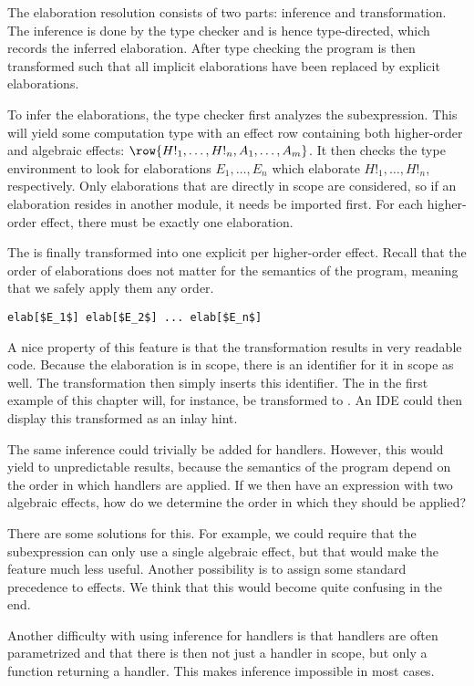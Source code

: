 The elaboration resolution consists of two parts: inference and transformation. The inference is done by the type checker and is hence type-directed, which records the inferred elaboration. After type checking the program is then transformed such that all implicit elaborations have been replaced by explicit elaborations.

To infer the elaborations, the type checker first analyzes the subexpression. This will yield some computation type with an effect row containing both higher-order and algebraic effects: $\row{H!_1, \dots, H!_n, A_1, \dots, A_m}$. It then checks the type environment to look for elaborations $E_1, \dots, E_n$ which elaborate $H!_1, \dots, H!_n$, respectively. Only elaborations that are directly in scope are considered, so if an elaboration resides in another module, it needs be imported first. For each higher-order effect, there must be exactly one elaboration.

The  is finally transformed into one explicit  per higher-order effect. Recall that the order of elaborations does not matter for the semantics of the program, meaning that we safely apply them any order.

\begin{lstlisting}[language=elaine,style=fancy]
elab[$E_1$] elab[$E_2$] ... elab[$E_n$]
\end{lstlisting}

A nice property of this feature is that the transformation results in very readable code. Because the elaboration is in scope, there is an identifier for it in scope as well. The transformation then simply inserts this identifier. The \elab in the first example of this chapter will, for instance, be transformed to . An IDE could then display this transformed  as an inlay hint.


The same inference could trivially be added for handlers. However, this would yield to unpredictable results, because the semantics of the program depend on the order in which handlers are applied. If we then have an expression with two algebraic effects, how do we determine the order in which they should be applied?

There are some solutions for this. For example, we could require that the subexpression can only use a single algebraic effect, but that would make the feature much less useful. Another possibility is to assign some standard precedence to effects. We think that this would become quite confusing in the end.

Another difficulty with using inference for handlers is that handlers are often parametrized and that there is then not just a handler in scope, but only a function returning a handler. This makes inference impossible in most cases.